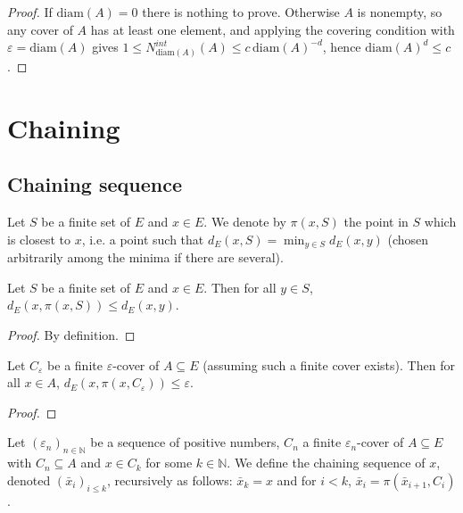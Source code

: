 \begin{proof}\leanok
If $\mathrm{diam}(A) = 0$ there is nothing to prove.
Otherwise $A$ is nonempty, so any cover of $A$ has at least one element, and applying the covering condition with $\varepsilon = \mathrm{diam}(A)$ gives
$1 \le N^{int}_{\mathrm{diam}(A)}(A) \le c \, \mathrm{diam}(A)^{-d}$, hence $\mathrm{diam}(A)^d \le c$.
\end{proof}


\section{Chaining}

\subsection{Chaining sequence}


\begin{definition}\label{def:nearestPt}
  \leanok
Let $S$ be a finite set of $E$ and $x \in E$.
We denote by $\pi(x, S)$ the point in $S$ which is closest to $x$, i.e. a point such that $d_E(x, S) = \min_{y \in S} d_E(x, y)$ (chosen arbitrarily among the minima if there are several).
\end{definition}


\begin{lemma}\label{lem:dist_nearestPt_le}
  \leanok
Let $S$ be a finite set of $E$ and $x \in E$.
Then for all $y \in S$, $d_E(x, \pi(x, S)) \le d_E(x, y)$.
\end{lemma}

\begin{proof}\leanok
By definition.
\end{proof}


\begin{lemma}\label{lem:dist_nearestPt_of_isCover}
  \leanok
Let $C_\varepsilon$ be a finite $\varepsilon$-cover of $A \subseteq E$ (assuming such a finite cover exists).
Then for all $x \in A$, $d_E(x, \pi(x, C_\varepsilon)) \le \varepsilon$.
\end{lemma}

\begin{proof}\leanok

\end{proof}


\begin{definition}\label{def:chainingSequence}
  \leanok
Let $(\varepsilon_n)_{n \in \mathbb{N}}$ be a sequence of positive numbers, $C_n$ a finite $\varepsilon_n$-cover of $A \subseteq E$ with $C_n \subseteq A$ and $x \in C_k$ for some $k \in \mathbb{N}$.
We define the chaining sequence of $x$, denoted $(\bar{x}_i)_{i \le k}$, recursively as follows: $\bar{x}_k = x$ and for $i < k$, $\bar{x}_i = \pi(\bar{x}_{i+1}, C_i)$.
\end{definition}


